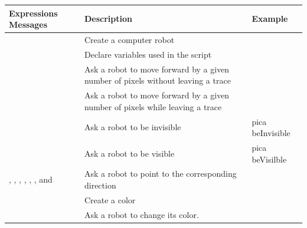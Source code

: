 \begin{table}[h]
  \centering
\begin{tabular}{| p{4cm} | p{5cm} | l |} \hline
  \hfil Expressions Messages & \hfil Description & \hfil Example \\[1ex] \hline
  \ct{Bot new} & Create a computer robot & \ct{pica := Bot new} \\ \hline
  \ct{| x y |} & Declare variables used in the script & \ct{| pica |} \\ \hline
  \ct{jump: anInteger}  & Ask a robot to move forward by a given number of pixels without leaving a trace & \ct{pica jump: 10} \\ \hline
  \ct{go: anInteger} & Ask a robot to move forward by a given number of pixels while leaving a trace & \ct{pica go: 10} \\ \hline
\ct{beInvisible}& Ask a robot to be invisible& pica beInvisible\\ \hline
\ct{beVisible}& Ask a robot to be visible& pica beVisilble\\ \hline
\ct{east}, \ct{north}, \ct{northEast}, \ct{northWest}, \ct{south}, \ct{southEast}, \ct{southWest} and \ct{west}& Ask a robot to point to the corresponding direction& \ct{pica north} \\ \hline
  \ct{Color }{\emph xxx} &Create a color& \ct{Color blue} \\ \hline
  \ct{color: aColor}&Ask a robot to change its color.& \ct{pica color: Color red} \\   \hline
\end{tabular}

\end{table}

\ifx\wholebook\relax\else\fi
